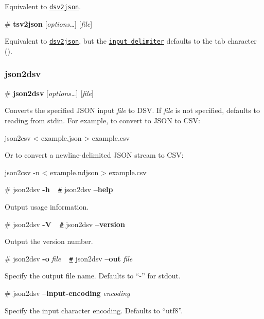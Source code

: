 Equivalent to \href{#dsv2json}{\tt dsv2json}.

\label{_tsv2json}%
\# {\bfseries tsv2json} \mbox{[}{\itshape options…}\mbox{]} \mbox{[}{\itshape file}\mbox{]}

Equivalent to \href{#dsv2json}{\tt dsv2json}, but the \href{#dsv2json_input_delimiter}{\tt input delimiter} defaults to the tab character ().

\subsubsection*{json2dsv}

\label{_json2dsv}%
\# {\bfseries json2dsv} \mbox{[}{\itshape options…}\mbox{]} \mbox{[}{\itshape file}\mbox{]}

Converts the specified J\+S\+ON input {\itshape file} to D\+SV. If {\itshape file} is not specified, defaults to reading from stdin. For example, to convert to J\+S\+ON to C\+SV\+:


\begin{DoxyCode}
json2csv < example.json > example.csv
\end{DoxyCode}


Or to convert a newline-\/delimited J\+S\+ON stream to C\+SV\+:


\begin{DoxyCode}
json2csv -n < example.ndjson > example.csv
\end{DoxyCode}


\label{_json2dsv_help}%
\# json2dsv {\bfseries -\/h} ~\newline
\href{json2dsv_help}{\tt \#} json2dsv {\bfseries --help}

Output usage information.

\label{_json2dsv_version}%
\# json2dsv {\bfseries -\/V} ~\newline
\href{json2dsv_version}{\tt \#} json2dsv {\bfseries --version}

Output the version number.

\label{_json2dsv_out}%
\# json2dsv {\bfseries -\/o} {\itshape file} ~\newline
\href{json2dsv_out}{\tt \#} json2dsv {\bfseries --out} {\itshape file}

Specify the output file name. Defaults to “-\/” for stdout.

\label{_json2dsv_input_encoding}%
\# json2dsv {\bfseries --input-\/encoding} {\itshape encoding}

Specify the input character encoding. Defaults to “utf8”.

